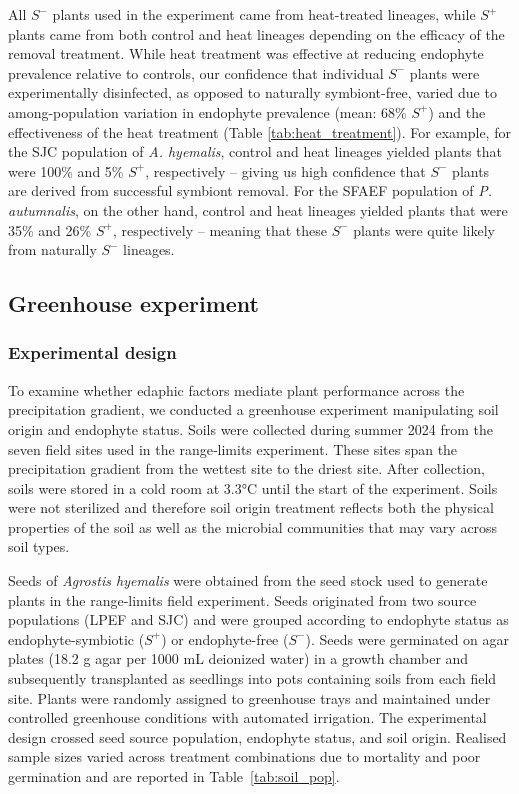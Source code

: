 \documentclass[12pt]{article}\usepackage[]{graphicx}\usepackage[dvipsnames]{xcolor}
\begin{document}
All $S^-$ plants used in the experiment came from heat-treated lineages, while $S^+$ plants came from both control and heat lineages depending on the efficacy of the removal treatment. 
While heat treatment was effective at reducing endophyte prevalence relative to controls, our confidence that individual $S^-$ plants were experimentally disinfected, as opposed to naturally symbiont-free, varied due to among-population variation in endophyte prevalence (mean: 68\% $S^+$) and the effectiveness of the heat treatment (Table \ref{tab:heat_treatment}). 
For example, for the SJC population of \emph{A. hyemalis}, control and heat lineages yielded plants that were 100\% and 5\% $S^+$, respectively -- giving us high confidence that $S^-$ plants are derived from successful symbiont removal. 
For the SFAEF population of \emph{P. autumnalis}, on the other hand, control and heat lineages yielded plants that were 35\% and 26\% $S^+$, respectively -- meaning that these $S^-$ plants were quite likely from naturally $S^-$ lineages.


\subsection{Greenhouse experiment}
\label{sec:greenhouse}

\subsubsection{Experimental design}

To examine whether edaphic factors mediate plant performance across the precipitation gradient, we conducted a greenhouse experiment
manipulating soil origin and endophyte status.
Soils were collected during summer 2024 from the seven field sites used in the range‐limits experiment.
These sites span the precipitation gradient from the wettest site to the driest site. 
After collection, soils were stored in a cold room at 3.3°C until the start of the experiment. 
Soils were not sterilized and therefore soil origin treatment reflects both the physical properties of the soil as well as the microbial communities that may vary across soil types.

Seeds of \textit{Agrostis hyemalis} were obtained from the seed stock used to generate plants in the range-limits field experiment. 
Seeds originated from two source populations (LPEF and SJC) and were grouped according to endophyte status as endophyte-symbiotic ($S^+$) or endophyte-free ($S^-$).
Seeds were germinated on agar plates (18.2 g agar per 1000 mL deionized water) in a growth chamber and subsequently transplanted as seedlings
into pots containing soils from each field site. 
Plants were randomly assigned to greenhouse trays and maintained under controlled greenhouse conditions with automated irrigation.
The experimental design crossed seed source population, endophyte status, and soil origin. 
Realised sample sizes varied across treatment combinations due to mortality and poor germination and are reported in Table~\ref{tab:soil_pop}.
\end{document}
